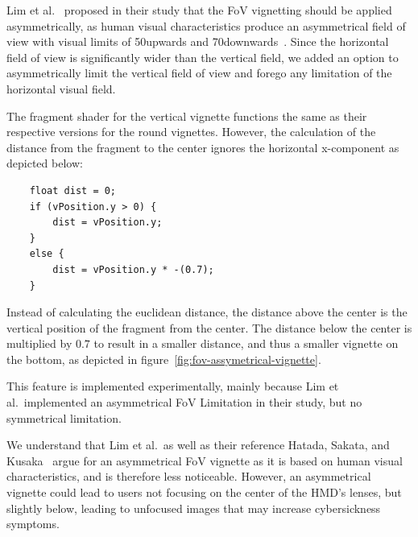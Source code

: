 Lim et al.~\cite{Lim2020} proposed in their study that the FoV vignetting should be applied asymmetrically, as human
visual characteristics produce an asymmetrical field of view with visual limits of 50\textdegree upwards and
70\textdegree downwards~\cite{Hatada1980}.
Since the horizontal field of view is significantly wider than the vertical field, we added an option to asymmetrically
limit the vertical field of view and forego any limitation of the horizontal visual field.

The fragment shader for the vertical vignette functions the same as their respective versions for the round
vignettes.
However, the calculation of the distance from the fragment to the center ignores the horizontal x-component as depicted
below:
\begin{verbatim}
    float dist = 0;
    if (vPosition.y > 0) {
        dist = vPosition.y;
    }
    else {
        dist = vPosition.y * -(0.7);
    }
\end{verbatim}
Instead of calculating the euclidean distance, the distance above the center is the vertical position of the fragment
from the center.
The distance below the center is multiplied by $0.7$ to result in a smaller distance, and thus a smaller vignette on
the bottom, as depicted in figure~\ref{fig:fov-assymetrical-vignette}.

This feature is implemented experimentally, mainly because Lim et al.\ implemented an asymmetrical FoV Limitation in
their study, but no symmetrical limitation.

We understand that Lim et al.\ as well as their reference Hatada, Sakata, and Kusaka~\cite{Hatada1980} argue for an
asymmetrical FoV vignette as it is based on human visual characteristics, and is therefore less noticeable.
However, an asymmetrical vignette could lead to users not focusing on the center of the HMD's lenses, but slightly
below, leading to unfocused images that may increase cybersickness symptoms.
